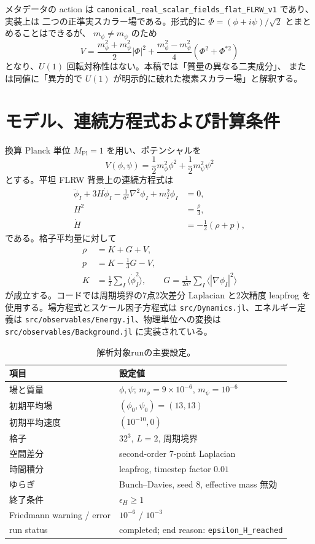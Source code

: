 \documentclass[a4paper,11pt]{ltjsarticle}
\newcommand{\code}[1]{\texttt{#1}}
\begin{document}
メタデータの action は
\code{canonical\_real\_scalar\_fields\_flat\_FLRW\_v1} であり、実装上は
二つの正準実スカラー場である。形式的に
$\Phi=(\phi+i\psi)/\sqrt{2}$ とまとめることはできるが、
$m_\phi\ne m_\psi$ のため
\begin{equation}
 V=\frac{m_\phi^2+m_\psi^2}{2}|\Phi|^2
  +\frac{m_\phi^2-m_\psi^2}{4}\left(\Phi^2+\Phi^{*2}\right)
\end{equation}
となり、$U(1)$ 回転対称性はない。本稿では「質量の異なる二実成分」、
または同値に「異方的で $U(1)$ が明示的に破れた複素スカラー場」と解釈する。

\section{モデル、連続方程式および計算条件}

換算 Planck 単位 $M_{\mathrm{Pl}}=1$ を用い、ポテンシャルを
\begin{equation}
 V(\phi,\psi)=\frac12m_\phi^2\phi^2+\frac12m_\psi^2\psi^2
\end{equation}
とする。平坦 FLRW 背景上の連続方程式は
\begin{align}
 \ddot\phi_I+3H\dot\phi_I-\frac{1}{a^2}\nabla^2\phi_I+m_I^2\phi_I&=0,\\
 H^2&=\frac{\rho}{3},\\
 \dot H&=-\frac12(\rho+p),
\end{align}
である。格子平均量に対して
\begin{align}
 \rho &= K+G+V,\\
 p &= K-\frac13G-V,\\
 K&=\frac12\sum_I\langle\dot\phi_I^2\rangle,\qquad
 G=\frac{1}{2a^2}\sum_I\langle|\nabla\phi_I|^2\rangle
\end{align}
が成立する。コードでは周期境界の7点2次差分 Laplacian と2次精度
leapfrog を使用する。場方程式とスケール因子方程式は
\code{src/Dynamics.jl}、エネルギー定義は
\code{src/observables/Energy.jl}、物理単位への変換は
\code{src/observables/Background.jl} に実装されている。

\begin{table}[H]
\centering
\caption{解析対象runの主要設定。}
\begin{tabular}{ll}
\toprule
項目 & 設定値 \\
\midrule
場と質量 & $\phi,\psi$; $m_\phi=9\times10^{-6}$, $m_\psi=10^{-6}$ \\
初期平均場 & $(\phi_0,\psi_0)=(13,13)$ \\
初期平均速度 & $(10^{-10},0)$ \\
格子 & $32^3$, $L=2$, 周期境界 \\
空間差分 & second-order 7-point Laplacian \\
時間積分 & leapfrog, timestep factor $0.01$ \\
ゆらぎ & Bunch--Davies, seed $8$, effective mass 無効 \\
終了条件 & $\epsilon_H\geq1$ \\
Friedmann warning / error & $10^{-6}$ / $10^{-3}$ \\
run status & completed; end reason: \code{epsilon\_H\_reached} \\
\bottomrule
\end{tabular}
\end{table}
\end{document}
